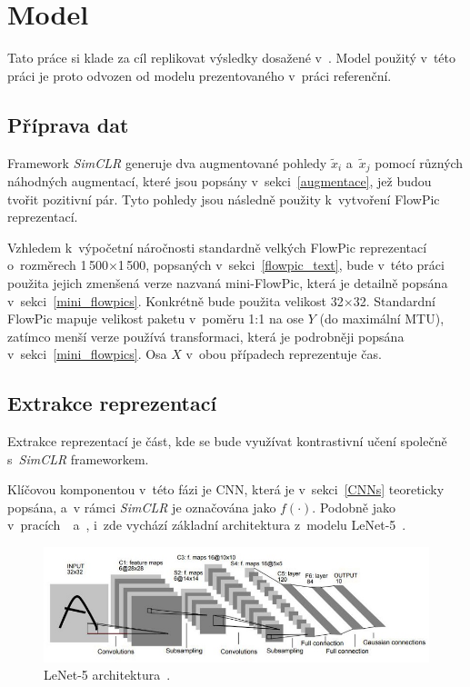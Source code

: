 \section{Model}
Tato práce si klade za cíl replikovat výsledky dosažené v~\cite{flowpic_augmentations}. Model použitý v~této práci je proto odvozen od modelu prezentovaného v~práci referenční.

\subsection{Příprava dat}
Framework \textit{SimCLR} generuje dva augmentované pohledy $\tilde{x}_i$ a~$\tilde{x}_j$ pomocí různých náhodných augmentací, které jsou popsány v~sekci~\ref{augmentace}, jež budou tvořit pozitivní pár. Tyto pohledy jsou následně použity k~vytvoření FlowPic reprezentací.

Vzhledem k~výpočetní náročnosti standardně velkých FlowPic reprezentací o~rozměrech 1\,500$\times$1\,500, popsaných v~sekci~\ref{flowpic_text}, bude v~této práci použita jejich zmenšená verze nazvaná mini-FlowPic, která je detailně popsána v~sekci~\ref{mini_flowpics}. Konkrétně bude použita velikost 32$\times$32. Standardní FlowPic mapuje velikost paketu v~poměru 1:1 na ose $Y$ (do maximální MTU), zatímco menší verze používá transformaci, která je podrobněji popsána v~sekci~\ref{mini_flowpics}. Osa $X$ v~obou případech reprezentuje čas.

\subsection{Extrakce reprezentací}
\label{extrakce}
Extrakce reprezentací je část, kde se bude využívat kontrastivní učení společně s~\textit{SimCLR} frameworkem.

Klíčovou komponentou v~této fázi je CNN, která je v~sekci~\ref{CNNs} teoreticky popsána, a~v rámci \textit{SimCLR} je označována jako $f(\cdot)$. Podobně jako v~pracích~\cite{flowpic_augmentations}~a~\cite{FlowPic}, i~zde vychází základní architektura z~modelu LeNet-5~\cite{lenet5}.
\begin{figure}[H]
	\centering
	\includegraphics[width=1\textwidth]{obrazky-figures/lenet5.jpeg}
	\caption{LeNet-5 architektura~\cite{lenet5}.}
	\label{lenet5_architektura}
\end{figure}

